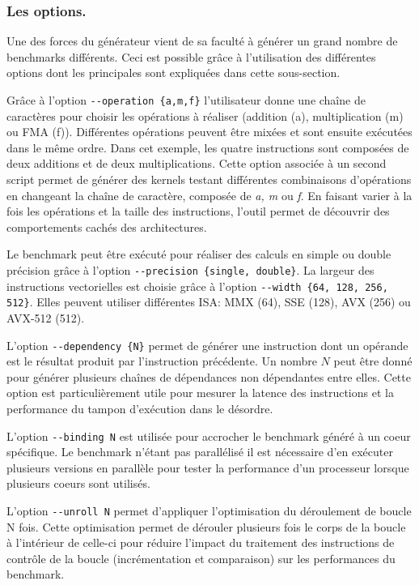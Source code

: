   
        \subsubsection{Les options.} 
        
            Une des forces du générateur vient de sa faculté à générer un grand nombre de benchmarks différents. Ceci est possible grâce à l'utilisation des différentes options dont les principales sont expliquées dans cette sous-section.
        
            Grâce à l'option \verb|--operation {a,m,f}| l'utilisateur donne une chaîne de caractères pour choisir  les opérations à réaliser (addition (a), multiplication (m) ou FMA (f)). Différentes opérations peuvent être mixées et sont ensuite exécutées dans le même ordre. Dans cet exemple, les quatre instructions sont composées de deux additions et de deux multiplications. Cette option associée à un second script permet de générer des kernels testant différentes combinaisons d'opérations en changeant la chaîne de caractère, composée de \textit{a, m} ou \textit{f}. En faisant varier à la fois les opérations et la taille des instructions, l'outil permet de découvrir des comportements cachés des architectures.
    
            Le benchmark peut être exécuté pour réaliser des calculs en simple ou double précision grâce à l'option \verb|--precision {single, double}|. 
            La largeur des instructions vectorielles est choisie grâce à l'option \verb|--width {64, 128, 256, 512}|. Elles peuvent utiliser différentes ISA: MMX (64), SSE (128), AVX (256) ou AVX-512 (512). 
            
            L'option \verb|--dependency {N}| permet de générer une instruction  dont un opérande est le résultat produit par l'instruction précédente. Un nombre $N$ peut être donné pour générer plusieurs chaînes de dépendances non dépendantes entre elles. Cette option est particulièrement utile pour mesurer la latence des instructions et la performance du tampon d'exécution dans le désordre.
            
            L'option \verb|--binding N| est utilisée pour accrocher le benchmark généré à un coeur spécifique. Le benchmark n'étant pas parallélisé il est nécessaire d'en exécuter plusieurs versions en parallèle pour tester la performance d'un processeur lorsque plusieurs coeurs sont utilisés.
            
            L'option \verb|--unroll N| permet d'appliquer l'optimisation du déroulement de boucle N fois. Cette optimisation permet de dérouler plusieurs fois le corps de la boucle à l'intérieur de celle-ci pour réduire l'impact du traitement des instructions de contrôle de la boucle (incrémentation et comparaison) sur les performances du benchmark. 
            
